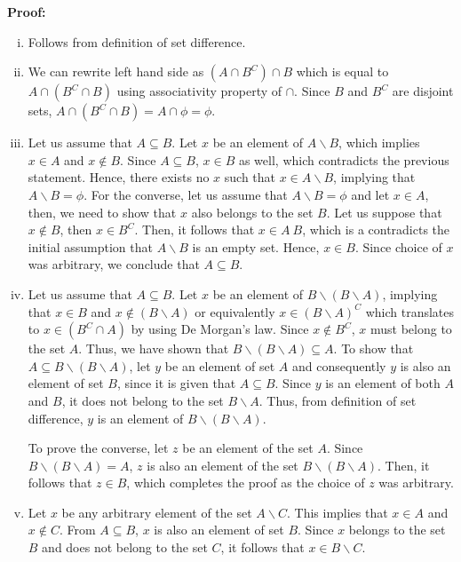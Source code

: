 \documentclass[a4paper,english,12pt]{article}
\begin{document}
\textbf{Proof: }
\begin{enumerate} [i)]
 \item Follows from definition of set difference.
 \item We can rewrite left hand side as $(A \cap B^{C}) \cap B$ which is equal to 
 $A \cap (B^{C} \cap B)$ using associativity property of $\cap$. Since $B$ and $B^{C}$ are disjoint sets, $A \cap (B^{C} \cap B) = A \cap \phi = \phi$. 
 \item Let us assume that $A \subseteq B$. Let $x$ be an element of $A \backslash B$, which implies $x \in A$ and $x \notin B$. Since $A \subseteq B$, $x \in B$ as well, which contradicts the previous  statement. Hence, there exists no $x$ such that $x \in A \backslash B$, implying that $A \backslash B = \phi$.  For the converse, let us assume that $A \backslash B = \phi$ and let $x \in A$, then, we need to show that $x$ also belongs to the set $B$. Let us suppose that $x \notin B$, then $x \in B^{C}$. Then, it follows that $x \in A \ B$, which is a contradicts the initial assumption that 
 $A \backslash B$ is an empty set. Hence, $x \in B$. Since choice of $x$ was arbitrary, we conclude that $A \subseteq B$.    
 \item Let us assume that $A \subseteq B$. Let $x$ be an element of $B \backslash (B \backslash A)$, implying that $x \in B$ and $x \notin (B \backslash A)$ or equivalently $x \in (B \backslash A)^{C}$
 which translates to $x \in (B^{C} \cap A)$ by using De Morgan’s law. Since $x \notin B^{C}$, $x$ must belong to the set $A$. Thus, we have shown that $B \backslash (B \backslash A) \subseteq A$.
To show that $A \subseteq B \backslash (B \backslash A)$, let $y$ be an element of set $A$ and consequently $y$ is also an element of set $B$, since it is given that $A \subseteq B$. Since $y$ is an element of both $A$ and $B$, it does not belong to the set $B \backslash A$. Thus, from definition of set difference, $y$ is an element of $B \backslash (B \backslash A)$.

To prove the converse, let $z$ be an element of the set $A$. Since $B \backslash (B \backslash A) = A$, $z$ is also an element of the set $B \backslash (B \backslash A)$. Then, it follows that $z \in B$, which completes the proof as the choice of $z$ was arbitrary.
 
\item Let $x$ be any arbitrary element of the set $A \backslash C$. This implies that $x \in A$ and $x \notin C$. From $A \subseteq B$, $x $ is also an element of set $B$. Since $x$ belongs to the set $B$ and does not belong to the set $C$, it follows that $x \in B \backslash C$. 


\end{enumerate}
\end{document}
